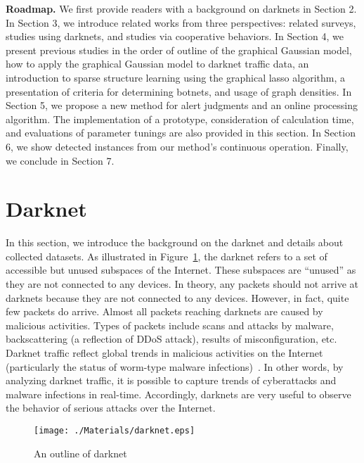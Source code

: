 \documentclass[letterpaper]{sig-alternate-10pt}
\begin{document}
\vspace*{0.3 cm}
\noindent
\textbf{Roadmap.}\space\space
We first provide readers with a background on darknets in Section 2.
In Section 3, we introduce related works from three perspectives: related surveys, studies using darknets, and studies via cooperative behaviors.
In Section 4, we present previous studies in the order of outline of the graphical Gaussian model, how to apply the graphical Gaussian model to darknet traffic data, an introduction to sparse structure learning using the graphical lasso algorithm, a presentation of criteria for determining botnets, and usage of graph densities.
In Section 5, we propose a new method for alert judgments and an online processing algorithm.
The implementation of a prototype, consideration of calculation time, and evaluations of parameter tunings are also provided in this section.
In Section 6, we show detected instances from our method's continuous operation.
Finally, we conclude in Section 7.

\section{Darknet}
In this section, we introduce the background on the darknet and details about collected datasets.
As illustrated in Figure~\ref{fig:darknet}, the darknet refers to a set of accessible but unused subspaces of the Internet.
These subspaces are ``unused'' as they are not connected to any devices.
In theory, any packets should not arrive at darknets because they are not connected to any devices.
However, in fact, quite few packets do arrive.
Almost all packets reaching darknets are caused by malicious activities.
Types of packets include scans and attacks by malware, backscattering (a reflection of DDoS attack), results of misconfiguration, etc.
Darknet traffic reflect global trends in malicious activities on the Internet (particularly the status of worm-type malware infections)~\cite{CyberLab}.
In other words, by analyzing darknet traffic, it is possible to capture trends of cyberattacks and malware infections in real-time.
Accordingly, darknets are very useful to observe the behavior of serious attacks over the Internet.


\begin{figure}[tb]
\begin{center}
	\texttt{[image: ./Materials/darknet.eps]}
	\caption{An outline of darknet}
  	\label{fig:darknet}
\end{center}
\end{figure}
\end{document}
